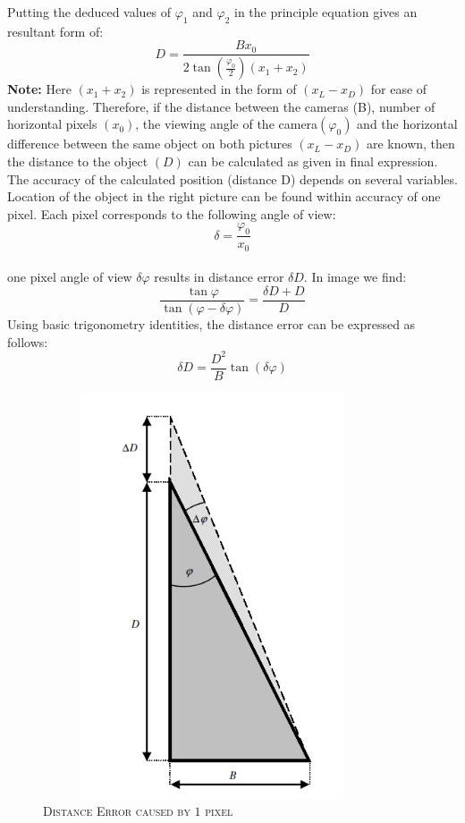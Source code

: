 Putting the deduced values of $\varphi_{1}$ and $\varphi_{2}$ in the principle equation gives an resultant form of:
\begin{equation}
D=\frac{Bx_{0}}{2\tan(\frac{\varphi_{0}}{2})(x_{1}+x_{2})}
\end{equation}
\textbf{Note:} Here $(x_{1}+x_{2})$ is represented in the form of $(x_{L}-x_{D})$ for ease of understanding.
\newpage
Therefore, if the distance between the cameras (B), number of horizontal pixels $(x_{0})$, the viewing angle of the camera$(\varphi_{0})$ and the horizontal difference between the same object on both pictures $(x_{L}-x_{D})$ are known, then the distance to the object $(D)$ can be calculated as given in  final expression.
The accuracy of the calculated position (distance D) depends on several variables. Location of the object in the right picture can be found within accuracy of one pixel. Each pixel corresponds to the following angle of view:\\
\begin{equation}
\delta=\frac{\varphi_{0}}{x_{0}}
\end{equation}
\\one pixel angle of view $\delta\varphi$ results in distance error $\delta D$. In image we find:
\begin{equation}
\frac{\tan\varphi}{\tan(\varphi-\delta\varphi)}=\frac{\delta D+D}{D}
\end{equation}
Using basic trigonometry identities, the distance error can be expressed as follows:\\
\begin{equation}
\delta D= \frac{D^{2}}{B}\tan(\delta\varphi)
\end{equation}
\begin{figure}[H]
	\centering
	\includegraphics[height= 12cm, width=10cm]{project/images/z.png}
	\caption{\textsc{Distance Error caused by $1$ pixel}}
\end{figure}